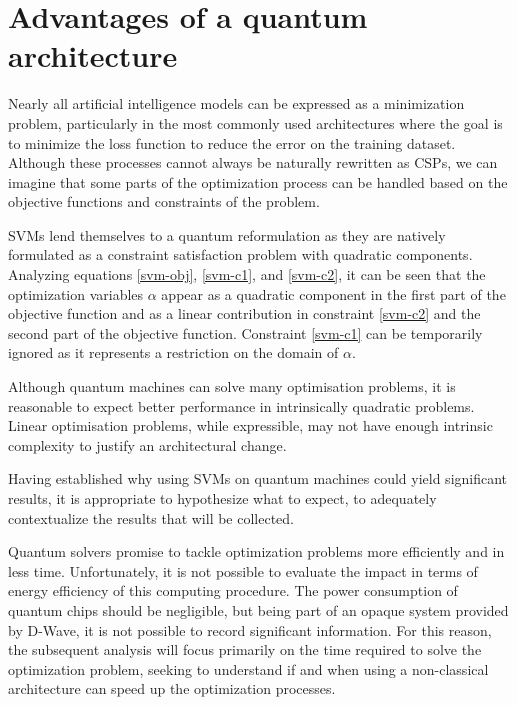 \section{Advantages of a quantum architecture}

Nearly all artificial intelligence models can be expressed as a minimization problem, particularly in the most commonly used architectures where the goal is to minimize the loss function to reduce the error on the training dataset. Although these processes cannot always be naturally rewritten as CSPs, we can imagine that some parts of the optimization process can be handled based on the objective functions and constraints of the problem.

SVMs lend themselves to a quantum reformulation as they are natively formulated as a constraint satisfaction problem with quadratic components\cite{QSVM}. Analyzing equations \ref{svm-obj}, \ref{svm-c1}, and \ref{svm-c2}, it can be seen that the optimization variables $\alpha$ appear as a quadratic component in the first part of the objective function and as a linear contribution in constraint \ref{svm-c2} and the second part of the objective function. Constraint \ref{svm-c1} can be temporarily ignored as it represents a restriction on the domain of $\alpha$.

Although quantum machines can solve many optimisation problems, it is reasonable to expect better performance in intrinsically quadratic problems. Linear optimisation problems, while expressible, may not have enough intrinsic complexity to justify an architectural change.

Having established why using SVMs on quantum machines could yield significant results, it is appropriate to hypothesize what to expect, to adequately contextualize the results that will be collected.

Quantum solvers promise to tackle optimization problems more efficiently and in less time. Unfortunately, it is not possible to evaluate the impact in terms of energy efficiency of this computing procedure. The power consumption of quantum chips should be negligible\cite{QPUefficiency}, but being part of an opaque system provided by D-Wave, it is not possible to record significant information. For this reason, the subsequent analysis will focus primarily on the time required to solve the optimization problem, seeking to understand if and when using a non-classical architecture can speed up the optimization processes.